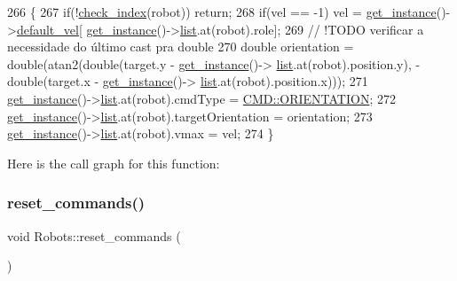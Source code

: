 \begin{DoxyCode}
266                                                          \{
267     \textcolor{keywordflow}{if}(!\hyperlink{robots_8hpp_ae3e6ae8f87cdc750c0b99bc609d9ae43}{check\_index}(robot)) \textcolor{keywordflow}{return};
268     \textcolor{keywordflow}{if}(vel == -1) vel = \hyperlink{class_robots_a589bce74db5f34af384952d48435168f}{get\_instance}()->\hyperlink{class_robots_a6c03d49137645a67d5c5e39bb953a788}{default\_vel}[
      \hyperlink{class_robots_a589bce74db5f34af384952d48435168f}{get\_instance}()->\hyperlink{class_robots_a2c6b77265028f82a4342ca1ef15ed305}{list}.at(robot).role];
269     \textcolor{comment}{// !TODO verificar a necessidade do último cast pra double}
270     \textcolor{keywordtype}{double} orientation = double(atan2(\textcolor{keywordtype}{double}(target.y - \hyperlink{class_robots_a589bce74db5f34af384952d48435168f}{get\_instance}()->
      \hyperlink{class_robots_a2c6b77265028f82a4342ca1ef15ed305}{list}.at(robot).position.y), -\textcolor{keywordtype}{double}(target.x - \hyperlink{class_robots_a589bce74db5f34af384952d48435168f}{get\_instance}()->
      \hyperlink{class_robots_a2c6b77265028f82a4342ca1ef15ed305}{list}.at(robot).position.x)));
271     \hyperlink{class_robots_a589bce74db5f34af384952d48435168f}{get\_instance}()->\hyperlink{class_robots_a2c6b77265028f82a4342ca1ef15ed305}{list}.at(robot).cmdType = \hyperlink{serial_w_8hpp_ac815b03ec48abf99301f44140ff0b0a9}{CMD::ORIENTATION};
272     \hyperlink{class_robots_a589bce74db5f34af384952d48435168f}{get\_instance}()->\hyperlink{class_robots_a2c6b77265028f82a4342ca1ef15ed305}{list}.at(robot).targetOrientation = orientation;
273     \hyperlink{class_robots_a589bce74db5f34af384952d48435168f}{get\_instance}()->\hyperlink{class_robots_a2c6b77265028f82a4342ca1ef15ed305}{list}.at(robot).vmax = vel;
274 \}
\end{DoxyCode}
Here is the call graph for this function\+:
\mbox{\label{class_robots_af9dfd621b03a3c6a52810610abdb6a9d}} 
\subsubsection{\texorpdfstring{reset\+\_\+commands()}{reset\_commands()}}
{\footnotesize\ttfamily void Robots\+::reset\+\_\+commands (\begin{DoxyParamCaption}{ }\end{DoxyParamCaption})\hspace{0.3cm}{\ttfamily [static]}}

